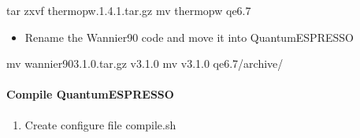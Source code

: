\documentclass[a4paper,12pt,english]{sphinxmanual}
\begin{document}
\begin{sphinxVerbatim}[commandchars=\\\{\}]
tar zxvf thermo\PYGZus{}pw.1.4.1.tar.gz  mv thermo\PYGZus{}pw qe\PYGZhy{}6.7
\end{sphinxVerbatim}
\begin{itemize}
\item {} 
\sphinxAtStartPar
Rename the Wannier90 code and move it into Quantum\sphinxhyphen{}ESPRESSO

\end{itemize}

\begin{sphinxVerbatim}[commandchars=\\\{\}]
mv wannier90\PYGZhy{}3.1.0.tar.gz v3.1.0  mv v3.1.0 qe\PYGZhy{}6.7/archive/
\end{sphinxVerbatim}


\paragraph{Compile Quantum\sphinxhyphen{}ESPRESSO}
\label{\detokenize{compile/Quantum-ESPRESSO_6.7:compile-quantum-espresso}}\begin{enumerate}
%
\item {} 
\sphinxAtStartPar
Create configure file compile.sh

\end{enumerate}
\end{document}
